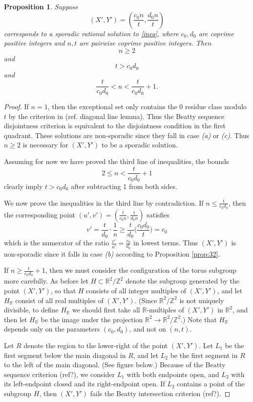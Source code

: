 \documentclass[12pt,letterpaper, reqno]{amsart}
\newtheorem{prop}[thm]{Proposition}
\theoremstyle{definition}
\theoremstyle{remark}
\newcommand{\RR}{\ensuremath{\mathbb{R}}}
\newcommand{\ZZ}{\ensuremath{\mathbb{Z}}}
\newcommand{\uu}{{u'}}
\newcommand{\vv}{{v'}}
\begin{document}
\begin{prop}
Suppose
\[ (X',Y') = (\frac{c_0n}{t}, \frac{d_0n}{t})\]
corresponds to a sporadic rational solution to \eqref{ineq}, where $c_0,d_0$ are coprime positive integers and $n,t$ are pairwise coprime positive integers. Then
\[ n\geq 2\]
and
\[ t > c_0d_0\]
and
\[  \frac{t}{c_0d_0} < n < \frac{t}{c_0d_0}+1 .\]
\end{prop}
\begin{proof}
If $n = 1$, then the exceptional set only contains the 0 residue class modulo $t$ by the criterion in (ref. diagonal line lemma). Thus the Beatty sequence disjointness criterion is equivalent to the disjointness condition in the first quadrant. These solutions are non-sporadic since they fall in case {\it(a)} or {\it (c)}. Thus $n\geq 2$ is necessary for $(X',Y')$ to be a sporadic solution.

Assuming for now we have proved the third line of inequalities, the bounds
\[ 2 \leq n < \frac{t}{c_0d_0} + 1\]
clearly imply $t > c_0d_0$ after subtracting 1 from both sides.

We now prove the inequalities in  the third line by contradiction. If $n \leq \frac{t}{c_0d_0}$, then the corresponding point
$ (\uu,\vv) = (\frac{t}{c_0n},\frac{t}{d_0n})$
satisfies 
\[\vv = \frac{t}{d_0}\cdot \frac{1}{n} \geq \frac{t}{d_0}\big(\frac{c_0d_0}{t}\big) = c_0 \]
which is the numerator of the ratio $\frac{\vv}{\uu} = \frac{c_0}{d_0}$ in lowest terms.
Thus $(X',Y')$ is non-sporadic since it falls in case {\it(b)} according to Proposition \ref{prop:32}.

If $n \geq \frac{t}{c_0d_0}+1$, then we must consider the configuration of the torus subgroup more carefully.
As before let $H\subset \RR^2/\ZZ^2$ denote the subgroup generated by the point $(X',Y')$, so that $H$ consists of all integer multiples of $(X',Y')$, and let $H_\RR$ consist of all real multiples of $(X',Y')$. (Since $\RR^2/\ZZ^2$ is not uniquely divisible, to define $H_\RR$ we should first take all $\RR$-multiples of $(X',Y')$ in $\RR^2$, and then let $H_\RR$ be the image under the projection $\RR^2 \to \RR^2/\ZZ^2$.) Note that $H_\RR$ depends only on the parameters $(c_0,d_0)$, and not on $(n,t)$.

Let $R$ denote the region to the lower-right of the point $(X',Y')$. Let $L_1$ be the first segment below the main diagonal in $R$, and let $L_2$ be the first segment in $R$ to the left of the main diagonal. (See figure below.) Because of the Beatty sequence criterion (ref?), we consider $L_1$ with both endpoints open, and $L_2$ with its left-endpoint closed and its right-endpoint open.
If $L_2$ contains a point of the subgroup $H$, then $(X',Y')$ fails the Beatty intersection criterion (ref?). 


\end{proof}
\end{document}
